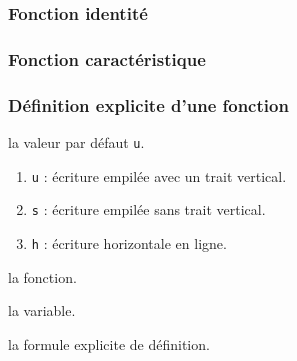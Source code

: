 \documentclass[12pt,a4paper]{article}
\theoremstyle{definition}
\begin{document}
\vspace{-.75em}
\begin{multicols}{2}
    
    
    
    
    
    
    
\end{multicols}


\subsubsection{Fonction identité}







\subsubsection{Fonction caractéristique}






\subsubsection{Définition explicite d'une fonction}





\IDoption{}  la valeur par défaut \verb+u+. 
\begin{enumerate}
	\item \verb+u+ : écriture empilée avec un trait vertical.
	
	\item \verb+s+ : écriture empilée sans trait vertical.

	\item \verb+h+ : écriture horizontale en ligne.
\end{enumerate}


 la fonction.

 la variable.

 la formule explicite de définition.
\end{document}
